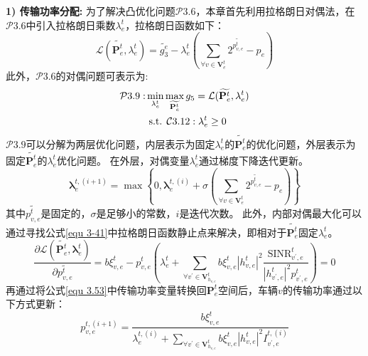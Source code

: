 \textbf{1) 传输功率分配:} 为了解决凸优化问题$\mathcal{P}3.6$，本章首先利用拉格朗日对偶法\cite{boyd2004convex}，在$\mathcal{P}3.6$中引入拉格朗日乘数$\lambda_{e}^{t}$，拉格朗日函数如下：
\begin{equation}
	\mathcal{L}(\widetilde{\mathbf{{P}}_{e}^{t}}, {\lambda}_{e}^{t} ) = \widetilde{g_3^{e}} -  {\lambda}_{e}^{t} (\sum_{\forall v \in \mathbf{V}_{e}^{t}} 2^{\widetilde{p_{v, e}^{t}}} - p_{e} )
	\label{equ 3-41}
\end{equation}
此外，$\mathcal{P}3.6$的对偶问题可表示为:
\begin{align}
	\mathcal{P}3.9: & \min_{{\lambda}_{e}^{t}} \max_{\widetilde{\mathbf{{P}}_{e}^{t}}}  g_5 = \mathcal{L}(\widetilde{\mathbf{{P}}_{e}^{t}}, {\lambda}_{e}^{t} ) \notag \\
	&\text { s.t. } \mathcal{C}3.12: \mathbf{\lambda}_{e}^{t} \geq 0  
\end{align}
$\mathcal{P}3.9$可以分解为两层优化问题，内层表示为固定${\lambda}_{e}^{t}$的$\widetilde{\mathbf{{P}}_{e}^{t}}$的优化问题，外层表示为固定$\widetilde{\mathbf{{P}}_{e}^{t}}$的${\lambda}_{e}^{t}$优化问题。
在外层，对偶变量${\lambda}_{e}^{t}$通过梯度下降迭代更新。
\begin{equation}
	\mathbf{\lambda}_{e}^{t, (i+1)} = \max\left\{0, \mathbf{\lambda}_{e}^{t, (i)} + \sigma (\sum_{\forall v \in \mathbf{V}_{e}^{t}} 2^{\widetilde{p_{v, e}^{t}}} - p_{e} )\right\}
\end{equation}
其中$\widetilde{p_{v, e}^{t}}$是固定的，$\sigma$是足够小的常数，$i$是迭代次数。
此外，内部对偶最大化可以通过寻找公式\ref{equ 3-41}中拉格朗日函数静止点来解决，即相对于$\widetilde{\mathbf{{P}}_{e}^{t}}$固定${\lambda}_{e}^{t}$。
\begin{equation}
\frac{\partial \mathcal{L}\left(\widetilde{\mathbf{{P}}_{e}^{t}}, \mathbf{\lambda}_{e}^{t} \right)}{\partial \widetilde{p_{v, e}^{t}}}= b  \xi_{v, e}^{t}  - p_{v, e}^{t}(\lambda_{e}^{t} +\sum\limits_{\forall v^{\prime} \in \mathbf{V}_{h_{v, e}}^{t}} b  \xi_{v, e}^{t} |h_{v, e}^t|^2 \frac{\mathrm{SINR}_{v^{\prime}, e}^t}{|h_{v^{\prime}, e}^t| ^{2} p_{v^{\prime}, e}^{t}}) =0
\label{equ 3.53}
\end{equation}
再通过将公式\ref{equ 3.53}中传输功率变量转换回$\mathbf{P}_{e}^{t}$空间后，车辆$v$的传输功率通过以下方式更新：
\begin{equation}
p_{v, e}^{t, {(i+1)}}=\frac{b \xi_{v, e}^{t}}{\lambda_{e}^{t,(i)}+\sum\limits_{\forall v^{\prime} \in \mathbf{V}_{h_{v, e}}^{t}} b  \xi_{v, e}^{t}|h_{v, e}^t|^2 {I}_{v^{\prime}, e}^{t, (i)} }
\end{equation}
